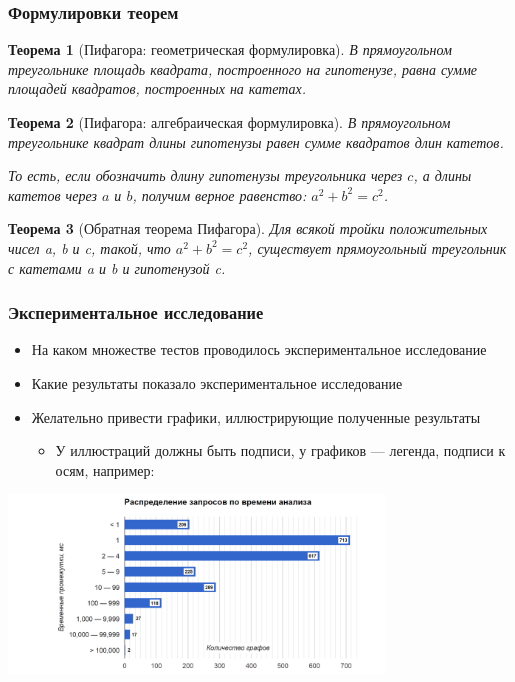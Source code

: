 \documentclass{beamer}
\newtheorem{rutheorem}{Теорема}
\begin{document}
\begin{frame}[fragile]
  \frametitle{Формулировки теорем}
  \begin{rutheorem}[Пифагора: геометрическая формулировка]
    В прямоугольном треугольнике площадь квадрата, построенного на гипотенузе, равна сумме площадей квадратов, построенных на катетах.
  \end{rutheorem}

  \begin{rutheorem}[Пифагора: алгебраическая формулировка]
    В прямоугольном треугольнике квадрат длины гипотенузы равен сумме квадратов длин катетов.    

    То есть, если обозначить длину гипотенузы треугольника через $c$, а длины катетов 
через $a$ и $b$, получим верное равенство: $a^2 + b^2 = c^2$.
  \end{rutheorem}

  \begin{rutheorem}[Обратная теорема Пифагора]
    Для всякой тройки положительных чисел a, b и c, такой, что $a^2 + b^2 = c^2$, существует прямоугольный треугольник с катетами a и b и гипотенузой c.
  \end{rutheorem}  
\end{frame}

\begin{frame}[t]
  \frametitle{Экспериментальное исследование}
  \begin{itemize}
    \item На каком множестве тестов проводилось экспериментальное исследование
    \item Какие результаты показало экспериментальное исследование
    \item Желательно привести графики, иллюстрирующие полученные результаты
    \begin{itemize}
      \item У иллюстраций должны быть подписи, у графиков --- легенда, подписи к осям, например:
    \end{itemize}
  \end{itemize}
  \includegraphics[width=10cm]{pictures/dist.png}
\end{frame}
\end{document}
